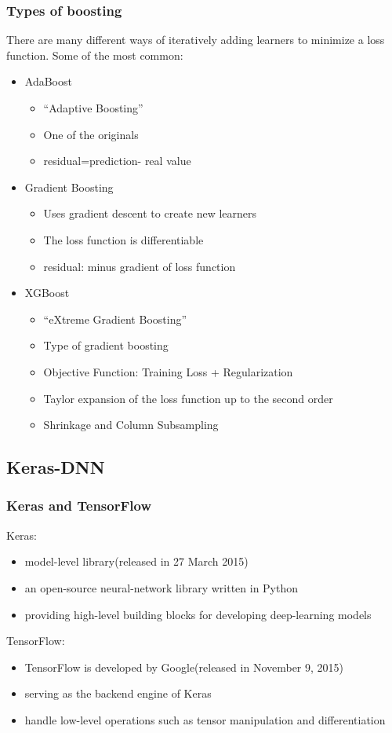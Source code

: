 \documentclass{beamer}
\begin{document}
\begin{frame}
\frametitle{Types of boosting}
There are many different ways of iteratively adding learners to minimize a loss function.
Some of the most common:\\
\begin{itemize}
\item AdaBoost
\begin{itemize}
\item “Adaptive Boosting”
\item One of the originals
\item residual=prediction- real value 
\end{itemize}

\item Gradient Boosting
\begin{itemize}
\item Uses gradient descent to create new learners
\item The loss function is differentiable 
\item residual: minus gradient of loss function
\end{itemize}

\item XGBoost
\begin{itemize}
\item “eXtreme Gradient Boosting”
\item Type of gradient boosting
\item Objective Function: Training Loss + Regularization
\item Taylor expansion of the loss function up to the second order
\item Shrinkage and Column Subsampling
\end{itemize}
\end{itemize}
\end{frame}

\subsection{Keras-DNN}
\begin{frame}
\frametitle{Keras and TensorFlow}
Keras:
\begin{itemize}
\item model-level library(released in 27 March 2015)
\item an open-source neural-network library written in Python
\item providing high-level building blocks for developing deep-learning models
\end{itemize}
TensorFlow:
\begin{itemize}
\item TensorFlow is developed by Google(released in  November 9, 2015)
\item serving as the backend engine of Keras
\item handle low-level operations such as tensor manipulation and differentiation
\end{itemize}
\end{frame}
\end{document}
